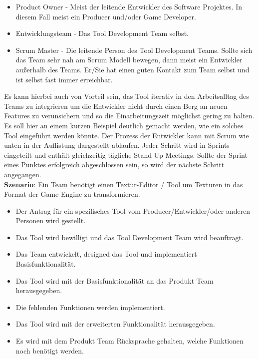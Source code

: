 \documentclass[pagesize, paper=a4, fontsize=12pt, titlepage=true, headings=small, headnosepline, abstractoff, liststotoc, nochapterprefix, plainheadsepline, twoside]{scrreprt}
\begin{document}
\begin{itemize}
\item Product Owner - Meist der leitende Entwickler des Software Projektes. In diesem Fall meist ein Producer und/oder Game Developer.
\item Entwicklungsteam - Das Tool Development Team selbst.
\item Scrum Master - Die leitende Person des Tool Development Teams. Sollte sich das Team sehr nah am Scrum Modell bewegen, dann meist ein Entwickler außerhalb des Teams. Er/Sie hat einen guten Kontakt zum Team selbst und ist selbst fast immer erreichbar.
\end{itemize}
Es kann hierbei auch von Vorteil sein, das Tool iterativ in den Arbeitsalltag des Teams zu integrieren um die Entwickler nicht durch einen Berg an neuen Features zu verunsichern und so die Einarbeitungszeit möglichst gering zu halten.
\\
Es soll hier an einem kurzen Beispiel deutlich gemacht werden, wie ein solches Tool eingeführt werden könnte. Der Prozess der Entwickler kann mit Scrum wie unten in der Auflistung dargestellt ablaufen. Jeder Schritt wird in Sprints eingeteilt und enthält gleichzeitig tägliche Stand Up Meetings. Sollte der Sprint eines Punktes erfolgreich abgeschlossen sein, so wird der nächste Schritt angegangen.
\\
\textbf{Szenario}: Ein Team benötigt einen Textur-Editor / Tool um Texturen in das Format der Game-Engine zu transformieren.
\begin{itemize}
\item Der Antrag für ein spezifisches Tool vom Producer/Entwickler/oder anderen Personen wird gestellt.
\item Das Tool wird bewilligt und das Tool Development Team wird beauftragt.
\item Das Team entwickelt, designed das Tool und implementiert Basisfunktionalität.
\item Das Tool wird mit der Basisfunktionalität an das Produkt Team herausgegeben.
\item Die fehlenden Funktionen werden implementiert.
\item Das Tool wird mit der erweiterten Funktionalität herausgegeben.
\item Es wird mit dem Produkt Team Rücksprache gehalten, welche Funktionen noch benötigt werden.
\end{itemize}
\end{document}
